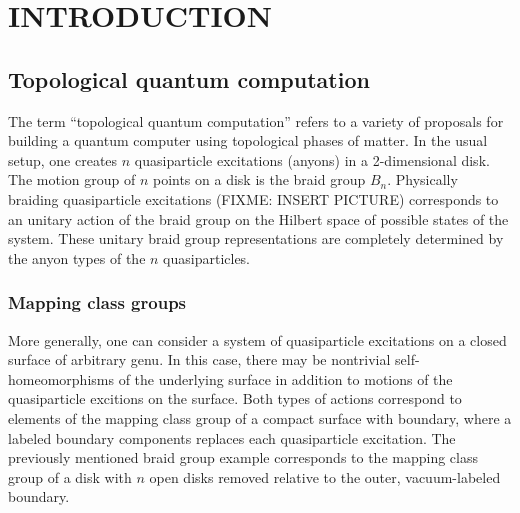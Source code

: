 %
%
%
%



\pagestyle{plain} %
\setcounter{page}{1}


\chapter{\uppercase {Introduction}}


\section{Topological quantum computation}

The term ``topological quantum computation'' refers to a variety of proposals for building a quantum computer using topological phases of matter.  In the usual setup, one creates $n$ quasiparticle excitations (anyons) in a 2-dimensional disk.  The motion group of $n$ points on a disk is the braid group $B_n$.  Physically braiding quasiparticle excitations (FIXME: INSERT PICTURE) corresponds to an unitary action of the braid group on the Hilbert space of possible states of the system.  These unitary braid group representations are completely determined by the anyon types of the $n$ quasiparticles.   

\subsection{Mapping class groups}

More generally, one can consider a system of quasiparticle excitations on a closed surface of arbitrary genu.  In this case, there may be nontrivial self-homeomorphisms of the underlying surface in addition to motions of the quasiparticle excitions on the surface.  Both types of actions correspond to elements of the mapping class group of a compact surface with boundary, where a labeled boundary components replaces each quasiparticle excitation. The previously mentioned braid group example corresponds to the mapping class group of a disk with $n$ open disks removed relative to the outer, vacuum-labeled boundary. 

